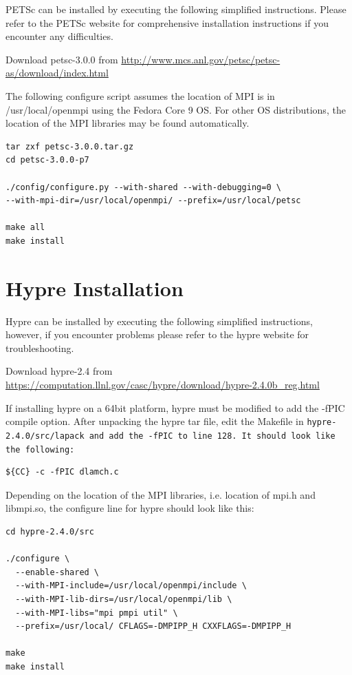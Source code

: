 \documentclass[12pt]{article}
\begin{document}
PETSc can be installed by executing the following simplified
instructions.  Please refer to the PETSc website for comprehensive
installation instructions if you encounter any difficulties.

Download petsc-3.0.0 from
\url{http://www.mcs.anl.gov/petsc/petsc-as/download/index.html}

The following configure script assumes the location of MPI is in
/usr/local/openmpi using the Fedora Core 9 OS.  For other OS
distributions, the location of the MPI libraries may be found
automatically.

\begin{Verbatim}
tar zxf petsc-3.0.0.tar.gz
cd petsc-3.0.0-p7

./config/configure.py --with-shared --with-debugging=0 \ 
--with-mpi-dir=/usr/local/openmpi/ --prefix=/usr/local/petsc

make all
make install
\end{Verbatim}

\section{Hypre Installation}

Hypre can be installed by executing the following simplified
instructions, however, if you encounter problems please refer to the
hypre website for troubleshooting.

Download hypre-2.4 from
\url{https://computation.llnl.gov/casc/hypre/download/hypre-2.4.0b\_reg.html}

If installing hypre on a 64bit platform, hypre must be modified to add
the -fPIC compile option.  After unpacking the hypre tar file, edit
the Makefile in \tt hypre-2.4.0/src/lapack \normalfont and add the
-fPIC to line 128.  It should look like the following:

\begin{verbatim}
${CC} -c -fPIC dlamch.c
\end{verbatim}

Depending on the location of the MPI libraries, i.e. location of mpi.h
and libmpi.so, the configure line for hypre should look like this:
\begin{verbatim}
cd hypre-2.4.0/src

./configure \
  --enable-shared \
  --with-MPI-include=/usr/local/openmpi/include \
  --with-MPI-lib-dirs=/usr/local/openmpi/lib \
  --with-MPI-libs="mpi pmpi util" \
  --prefix=/usr/local/ CFLAGS=-DMPIPP_H CXXFLAGS=-DMPIPP_H

make
make install
\end{verbatim}
\end{document}
